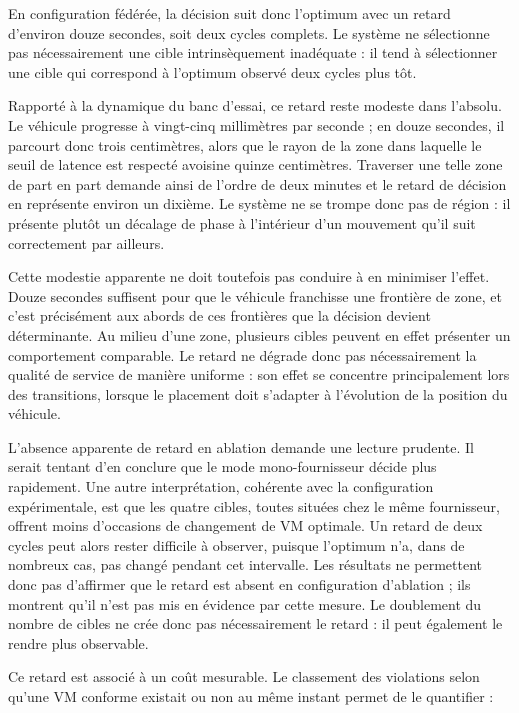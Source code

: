 En configuration fédérée, la décision suit donc l'optimum avec un retard d'environ douze secondes, soit deux cycles complets. Le système ne sélectionne pas nécessairement une cible intrinsèquement inadéquate : il tend à sélectionner une cible qui correspond à l'optimum observé deux cycles plus tôt.

Rapporté à la dynamique du banc d'essai, ce retard reste modeste dans l'absolu. Le véhicule progresse à vingt-cinq millimètres par seconde ; en douze secondes, il parcourt donc trois centimètres, alors que le rayon de la zone dans laquelle le seuil de latence est respecté avoisine quinze centimètres. Traverser une telle zone de part en part demande ainsi de l'ordre de deux minutes et le retard de décision en représente environ un dixième. Le système ne se trompe donc pas de région : il présente plutôt un décalage de phase à l'intérieur d'un mouvement qu'il suit correctement par ailleurs.

Cette modestie apparente ne doit toutefois pas conduire à en minimiser l'effet. Douze secondes suffisent pour que le véhicule franchisse une frontière de zone, et c'est précisément aux abords de ces frontières que la décision devient déterminante. Au milieu d'une zone, plusieurs cibles peuvent en effet présenter un comportement comparable. Le retard ne dégrade donc pas nécessairement la qualité de service de manière uniforme : son effet se concentre principalement lors des transitions, lorsque le placement doit s'adapter à l'évolution de la position du véhicule.

L'absence apparente de retard en ablation demande une lecture prudente. Il serait tentant d'en conclure que le mode mono-fournisseur décide plus rapidement. Une autre interprétation, cohérente avec la configuration expérimentale, est que les quatre cibles, toutes situées chez le même fournisseur, offrent moins d'occasions de changement de VM optimale. Un retard de deux cycles peut alors rester difficile à observer, puisque l'optimum n'a, dans de nombreux cas, pas changé pendant cet intervalle. Les résultats ne permettent donc pas d'affirmer que le retard est absent en configuration d'ablation ; ils montrent qu'il n'est pas mis en évidence par cette mesure. Le doublement du nombre de cibles ne crée donc pas nécessairement le retard : il peut également le rendre plus observable.

Ce retard est associé à un coût mesurable. Le classement des violations selon qu'une VM conforme existait ou non au même instant permet de le quantifier :

